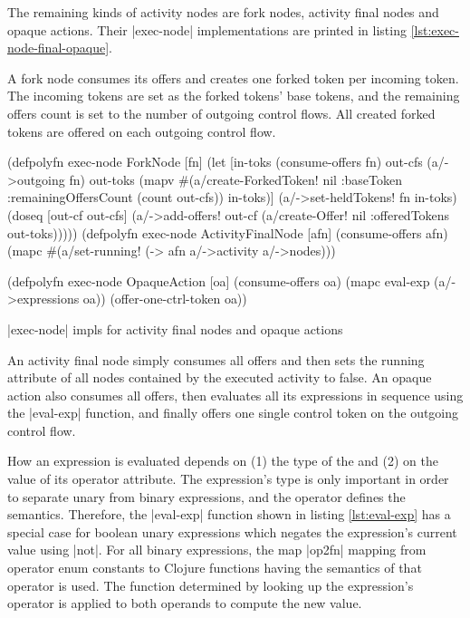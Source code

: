\documentclass[submission]{eptcs}
\newcommand{\code}{\clojureinline}
\begin{document}
The remaining kinds of activity nodes are fork nodes, activity final nodes and
opaque actions.  Their \code|exec-node| implementations are printed in listing
\vref{lst:exec-node-final-opaque}.

A fork node consumes its offers and creates one forked token per incoming
token.  The incoming tokens are set as the forked tokens' base tokens, and the
remaining offers count is set to the number of outgoing control flows.  All
created forked tokens are offered on each outgoing control flow.

\begin{listing}[h!tb]
\begin{clojurecode}
(defpolyfn exec-node ForkNode [fn]
  (let [in-toks  (consume-offers fn)
        out-cfs  (a/->outgoing fn)
        out-toks (mapv #(a/create-ForkedToken!
                         nil {:baseToken %
                              :remainingOffersCount (count out-cfs)})
                       in-toks)]
    (a/->set-heldTokens! fn in-toks)
    (doseq [out-cf out-cfs]
      (a/->add-offers! out-cf (a/create-Offer!
                               nil {:offeredTokens out-toks})))))
(defpolyfn exec-node ActivityFinalNode [afn]
  (consume-offers afn)
  (mapc #(a/set-running! %
        (-> afn a/->activity a/->nodes)))

(defpolyfn exec-node OpaqueAction [oa]
  (consume-offers oa)
  (mapc eval-exp (a/->expressions oa))
  (offer-one-ctrl-token oa))
\end{clojurecode}
\caption{\code|exec-node| impls for activity final nodes and opaque actions}
\label{lst:exec-node-final-opaque}
\end{listing}

An activity final node simply consumes all offers and then sets the
\textsf{running} attribute of all nodes contained by the executed activity to
false.  An opaque action also consumes all offers, then evaluates all its
expressions in sequence using the \code|eval-exp| function, and finally offers
one single control token on the outgoing control flow.

How an expression is evaluated depends on (1) the type of the and (2) on the
value of its \textsf{operator} attribute.  The expression's type is only
important in order to separate unary from binary expressions, and the operator
defines the semantics.  Therefore, the \code|eval-exp| function shown in
listing \vref{lst:eval-exp} has a special case for boolean unary expressions
which negates the expression's current value using \code|not|.  For all binary
expressions, the map \code|op2fn| mapping from operator enum constants to
Clojure functions having the semantics of that operator is used.  The function
determined by looking up the expression's operator is applied to both operands
to compute the new value.
\end{document}
